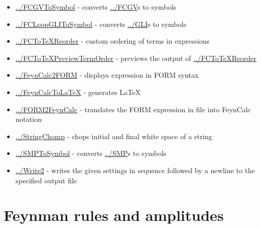 \documentclass[../FeynCalcManual.tex]{subfiles}
\begin{document}
\begin{itemize}
\tightlist
\item
  \hyperlink{../fcgvtosymbol}{../FCGVToSymbol} - converts
  \hyperlink{../fcgv}{../FCGV}s to symbols
\item
  \hyperlink{../fcloopglitosymbol}{../FCLoopGLIToSymbol} - converts
  \hyperlink{../gli}{../GLI}s to symbols
\item
  \hyperlink{../fctotexreorder}{../FCToTeXReorder} - custom ordering of
  terms in expressions
\item
  \hyperlink{../fctotexpreviewtermorder}{../FCToTeXPreviewTermOrder} -
  previews the output of
  \hyperlink{../fctotexreorder}{../FCToTeXReorder}
\item
  \hyperlink{../feyncalc2form}{../FeynCalc2FORM} - displays expression
  in FORM syntax
\item
  \hyperlink{../feyncalctolatex}{../FeynCalcToLaTeX} - generates LaTeX
\item
  \hyperlink{../form2feyncalc}{../FORM2FeynCalc} - translates the FORM
  expression in file into FeynCalc notation
\item
  \hyperlink{../stringchomp}{../StringChomp} - chops initial and final
  white space of a string
\item
  \hyperlink{../smptosymbol}{../SMPToSymbol} - converts
  \hyperlink{../smp}{../SMP}s to symbols
\item
  \hyperlink{../write2}{../Write2} - writes the given settings in
  sequence followed by a newline to the specified output file
\end{itemize}

\hypertarget{feynman rules and amplitudes}{
\section{Feynman rules and amplitudes}\label{feynman rules and amplitudes}}
\end{document}
